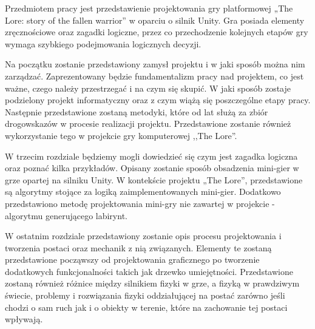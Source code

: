\documentclass[oneside,polski,logo]{amuthesis}
\author{Kamil Tyrek, Mateusz Hypś, Jakub Kozubal}
\date{Poznań, luty 2021}
\begin{document}
\maketitle

\author{Kamil Tyrek}
\makestatement

\author{Mateusz Hypś}
\makestatement

\author{Jakub Kozubal}
\makestatement

\begin{streszczenie}
Przedmiotem pracy jest przedstawienie projektowania gry platformowej „The Lore: story of the fallen warrior” w oparciu o silnik Unity. Gra posiada elementy zręcznościowe oraz zagadki logiczne, przez co przechodzenie kolejnych etapów gry wymaga szybkiego podejmowania logicznych decyzji. \par
Na początku zostanie przedstawiony zamysł projektu i w jaki sposób można nim zarządzać. Zaprezentowany będzie fundamentalizm pracy nad projektem, co jest ważne, czego należy przestrzegać i na czym się skupić. W jaki sposób zostaje podzielony projekt informatyczny oraz z czym wiążą się poszczególne etapy pracy. Następnie przedstawione zostaną metodyki, które od lat służą za zbiór drogowskazów w procesie realizacji projektu. Przedstawione zostanie również wykorzystanie tego w projekcie gry komputerowej ,,The Lore''. \par
W trzecim rozdziale będziemy mogli dowiedzieć się czym jest zagadka logiczna oraz poznać kilka przykładów. Opisany zostanie sposób obsadzenia mini-gier w grze opartej na silniku Unity. W kontekście projektu „The Lore”, przedstawione są algorytmy stojące za logiką zaimplementowanych mini-gier. Dodatkowo przedstawiono metodę projektowania mini-gry nie zawartej w projekcie - algorytmu generującego labirynt. \par
W ostatnim rozdziale przedstawiony zostanie opis procesu projektowania i tworzenia postaci oraz mechanik z nią związanych. Elementy te zostaną przedstawione począwszy od projektowania graficznego po tworzenie dodatkowych funkcjonalności takich jak drzewko umiejętności. Przedstawione zostaną również różnice między silnikiem fizyki w grze, a fizyką w prawdziwym świecie, problemy i rozwiązania fizyki oddziałującej na postać zarówno jeśli chodzi o sam ruch jak i o obiekty w terenie, które na zachowanie tej postaci wpływają. 

\end{streszczenie}
\tableofcontents
\end{document}
